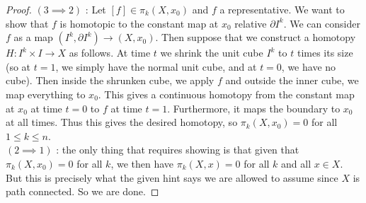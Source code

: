 \documentclass[reqno]{amsart}
\theoremstyle{definition}
\theoremstyle{remark}
\begin{document}
\begin{proof}
        \linebreak
        $(3 \implies 2)$ : 
        Let $\left[ f \right] \in \pi_k(X, x_0)$ and
        $f$ a representative. 
        We want to show that $f$ is homotopic to the
        constant map at $x_0$ relative $\partial I^{k}$.
        We can consider $f$ as a map
        $\left( I^{k}, \partial I^{k} \right) \to 
        \left( X, x_0 \right) $.  
        Then suppose that we construct a homotopy
        $H \colon I^{k} \times I \to X$ as follows.
        At time $t$ we shrink the unit cube $I^{k}$ to
        $t$ times its size (so at $t= 1$, we simply have
        the normal unit cube, and at $t= 0$, we have
        no cube). Then inside the shrunken cube, we
        apply $f$ and outside the inner cube, we map everything
        to $x_0$. This gives a continuous homotopy
        from the constant map at $x_0$ at time $t=0$ to
        $f$ at time $t = 1$. Furthermore, it maps
        the boundary to $x_0$ at all times. Thus
        this gives the desired homotopy, so
        $\pi_k (X, x_0) = 0$ for all $1 \le k \le n$.\\
        \linebreak
        $\left( 2 \implies 1 \right) $ : the only thing that
        requires showing is that
        given that $\pi_k(X, x_0) = 0$ for all $k$, we then
        have $\pi_k \left( X, x \right) = 0$ for all $k$ and
        all $x \in X$. But this is precisely what the given
        hint says we are allowed to assume since
        $X$ is path connected. So we are done.
    \end{proof}





\end{document}

